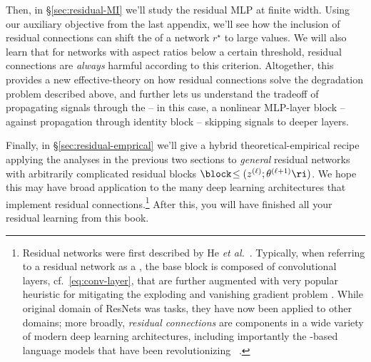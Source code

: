 Then, 
in \S\ref{sec:residual-MI} 
we'll study the residual MLP at finite width. Using our auxiliary  objective from the last appendix, we'll see how the inclusion of residual connections can shift the   of a network $r^\star$ 
to large values. 
We will also learn that for networks with aspect ratios below a certain threshold, residual connections are \emph{always} harmful according to this criterion.
Altogether, this provides a new effective-theory  on how residual connections solve the degradation problem described above, and further lets us understand the 
tradeoff of propagating signals through the   
-- in this case, a nonlinear MLP-layer block -- against propagation through identity block -- skipping signals to deeper layers. %





Finally, in \S\ref{sec:residual-emprical} we'll give a hybrid theoretical-empirical recipe 
applying the analyses in the previous two sections to
\emph{general} residual networks with arbitrarily complicated residual blocks $\block\!\le(z^{(\ell)}; \theta^{(\ell+1)}\ri)$. We hope this may have broad application to the many deep learning architectures that implement residual connections.\footnote{
    Residual networks were first described by He \emph{et al.}~\cite{he2016deep}. Typically, when referring to a residual network as a ,  the base block is composed of convolutional layers,
 cf.~\eqref{eq:conv-layer}, that are further augmented with very popular heuristic for mitigating the exploding and vanishing gradient problem \cite{batch-norm}. 
    While original domain of ResNets was  tasks, they have now been applied to other domains; more broadly, \emph{residual connections} are components in a wide variety of modern deep learning architectures,  including importantly the -based language models that have 
    been revolutionizing
    ~\cite{attention2017}. 
} 
After this, you will have finished all your residual learning from this book.














